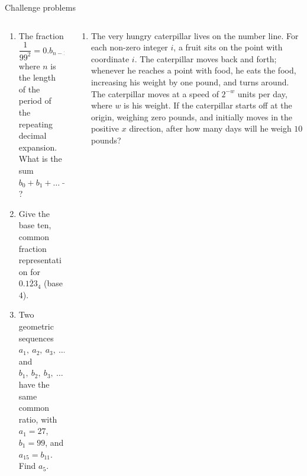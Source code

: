 \documentclass[9pt,aspectratio=169]{beamer}
\begin{document}
\begin{frame}{Challenge problems}
  \begin{columns}[T]
    \begin{column}{0.5\textwidth}
      \begin{enumerate}
        \item The fraction
        \[
        \frac{1}{99^2} = 0.\overline{b_{n−1}b_{n−2} \ldots b_2b_1b_0},
        \]
        where $n$ is the length of the period of the repeating decimal expansion. What is the sum $b_0 + b_1 + \ldots + b_{n−1}$? %
        \item Give the base ten, common fraction representation for $0.\overline{123}_4$ (base $4$). %
        \item Two geometric sequences $a_1,\ a_2,\ a_3,\ \ldots$ and $b_1,\ b_2,\ b_3,\ \ldots$ have the same common ratio, with $a_1 = 27$, $b_1=99$, and $a_{15}=b_{11}$. Find $a_5$. %
        \seti
      \end{enumerate}
    \end{column}
    \begin{column}{0.5\textwidth}
      \begin{enumerate}
        \conti
        \item The very hungry caterpillar lives on the number line. For each non-zero integer $i$, a fruit sits on the
        point with coordinate $i$. The caterpillar moves back and forth; whenever he reaches a point with food,
        he eats the food, increasing his weight by one pound, and turns around. The caterpillar moves at a
        speed of $2^{−w}$ units per day, where $w$ is his weight. If the caterpillar starts off at the origin, weighing
        zero pounds, and initially moves in the positive $x$ direction, after how many days will he weigh $10$ pounds? %
      \end{enumerate}
    \end{column}
  \end{columns}
\end{frame}

\end{document}

